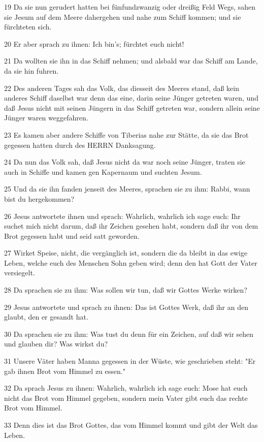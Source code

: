 \par 19 Da sie nun gerudert hatten bei fünfundzwanzig oder dreißig Feld Wegs, sahen sie Jesum auf dem Meere dahergehen und nahe zum Schiff kommen; und sie fürchteten sich.
\par 20 Er aber sprach zu ihnen: Ich bin's; fürchtet euch nicht!
\par 21 Da wollten sie ihn in das Schiff nehmen; und alsbald war das Schiff am Lande, da sie hin fuhren.
\par 22 Des anderen Tages sah das Volk, das diesseit des Meeres stand, daß kein anderes Schiff daselbst war denn das eine, darin seine Jünger getreten waren, und daß Jesus nicht mit seinen Jüngern in das Schiff getreten war, sondern allein seine Jünger waren weggefahren.
\par 23 Es kamen aber andere Schiffe von Tiberias nahe zur Stätte, da sie das Brot gegessen hatten durch des HERRN Danksagung.
\par 24 Da nun das Volk sah, daß Jesus nicht da war noch seine Jünger, traten sie auch in Schiffe und kamen gen Kapernaum und suchten Jesum.
\par 25 Und da sie ihn fanden jenseit des Meeres, sprachen sie zu ihm: Rabbi, wann bist du hergekommen?
\par 26 Jesus antwortete ihnen und sprach: Wahrlich, wahrlich ich sage euch: Ihr suchet mich nicht darum, daß ihr Zeichen gesehen habt, sondern daß ihr von dem Brot gegessen habt und seid satt geworden.
\par 27 Wirket Speise, nicht, die vergänglich ist, sondern die da bleibt in das ewige Leben, welche euch des Menschen Sohn geben wird; denn den hat Gott der Vater versiegelt.
\par 28 Da sprachen sie zu ihm: Was sollen wir tun, daß wir Gottes Werke wirken?
\par 29 Jesus antwortete und sprach zu ihnen: Das ist Gottes Werk, daß ihr an den glaubt, den er gesandt hat.
\par 30 Da sprachen sie zu ihm: Was tust du denn für ein Zeichen, auf daß wir sehen und glauben dir? Was wirkst du?
\par 31 Unsere Väter haben Manna gegessen in der Wüste, wie geschrieben steht: "Er gab ihnen Brot vom Himmel zu essen."
\par 32 Da sprach Jesus zu ihnen: Wahrlich, wahrlich ich sage euch: Mose hat euch nicht das Brot vom Himmel gegeben, sondern mein Vater gibt euch das rechte Brot vom Himmel.
\par 33 Denn dies ist das Brot Gottes, das vom Himmel kommt und gibt der Welt das Leben.

